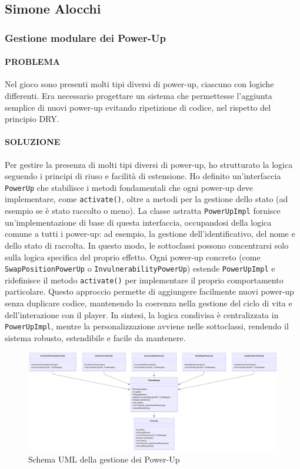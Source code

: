 \documentclass[a4paper,12pt]{report}
\begin{document}
\subsection{Simone Alocchi}

\subsubsection*{Gestione modulare dei Power-Up}

\paragraph{PROBLEMA}  
Nel gioco sono presenti molti tipi diversi di power-up, ciascuno con logiche differenti. Era necessario progettare un sistema che permettesse l'aggiunta semplice di nuovi power-up evitando ripetizione di codice, nel rispetto del principio DRY.

\paragraph{SOLUZIONE}  
Per gestire la presenza di molti tipi diversi di power-up, ho strutturato la logica seguendo i principi di riuso e facilità di estensione.  
Ho definito un’interfaccia \texttt{PowerUp} che stabilisce i metodi fondamentali che ogni power-up deve implementare, come \texttt{activate()}, oltre a metodi per la gestione dello stato (ad esempio se è stato raccolto o meno).
La classe astratta \texttt{PowerUpImpl} fornisce un’implementazione di base di questa interfaccia, occupandosi della logica comune a tutti i power-up: ad esempio, la gestione dell’identificativo, del nome e dello stato di raccolta.  
In questo modo, le sottoclassi possono concentrarsi solo sulla logica specifica del proprio effetto.
Ogni power-up concreto (come \texttt{SwapPositionPowerUp} o \texttt{InvulnerabilityPowerUp}) estende \texttt{PowerUpImpl} e ridefinisce il metodo \texttt{activate()} per implementare il proprio comportamento particolare.  
Questo approccio permette di aggiungere facilmente nuovi power-up senza duplicare codice, mantenendo la coerenza nella gestione del ciclo di vita e dell’interazione con il player.
In sintesi, la logica condivisa è centralizzata in \texttt{PowerUpImpl}, mentre la personalizzazione avviene nelle sottoclassi, rendendo il sistema robusto, estendibile e facile da mantenere.
\begin{figure}[H]
	\centering{}
	\includegraphics[width=14cm]{img/GestionePowerUp.png}
	\caption{Schema UML della gestione dei Power-Up}
	\label{img:Gestione PowerUp}
\end{figure}
\end{document}
